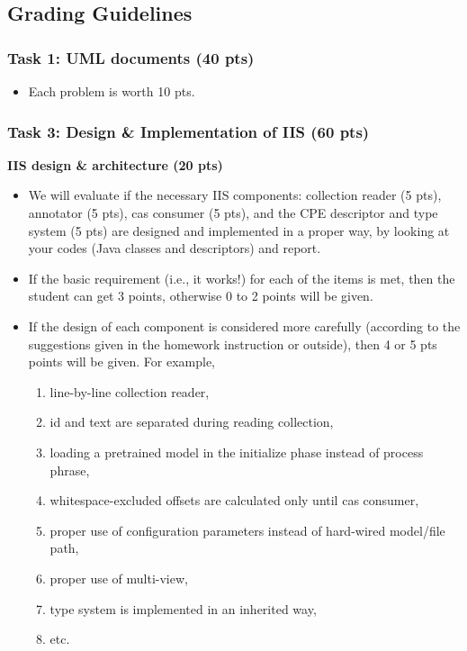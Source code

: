 
\newpage

\subsection{Grading Guidelines}

\subsubsection{Task 1: UML documents (40 pts)}

\begin{itemize}

\item Each problem is worth 10 pts. \\
 
\end{itemize}

\subsubsection{Task 3: Design \& Implementation of IIS (60 pts)}

\textbf{IIS design \& architecture (20 pts)}
 
\begin{itemize}

\item We will evaluate if the necessary IIS components: collection reader (5
pts), annotator (5 pts), cas consumer (5 pts), and the CPE descriptor and type
system (5 pts) are designed and implemented in a proper way, by looking at your
codes (Java classes and descriptors) and report.

\item If the basic requirement (i.e., it works!) for each of the items is met,
then the student can get 3 points, otherwise 0 to 2 points will be given.

\item If the design of each component is considered more carefully (according to
the suggestions given in the homework instruction or outside), then 4 or 5 pts
points will be given. For example,

\begin{enumerate}
\item line-by-line collection reader,
\item id and text are separated during reading collection,
\item loading a pretrained model in the initialize phase instead of process phrase,
\item whitespace-excluded offsets are calculated only until cas consumer,
\item proper use of configuration parameters instead of hard-wired model/file path,
\item proper use of multi-view,
\item type system is implemented in an inherited way,
\item etc.
\end{enumerate}

\end{itemize}

